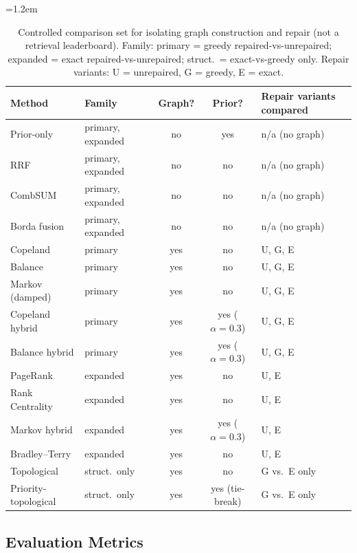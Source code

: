 \documentclass[pdflatex,sn-basic,Numbered]{sn-jnl}
\newcommand{\sncstable}{%
  \footnotesize
  \renewcommand{\arraystretch}{1.28}%
  \setlength{\tabcolsep}{3.8pt}%
  \tolerance=2000%
  \emergencystretch=1.2em%
  \hyphenpenalty=200\exhyphenpenalty=200\relax
}
\begin{document}
\begin{table}[t]
  \caption{Controlled comparison set for isolating graph construction and
    repair (not a retrieval leaderboard). Family: primary = greedy
    repaired-vs-unrepaired; expanded = exact repaired-vs-unrepaired;
    struct.\ = exact-vs-greedy only. Repair variants: U = unrepaired,
    G = greedy, E = exact.}
  \label{tab:baselines}
  \sncstable
  \begin{tabularx}{\linewidth}{@{}lYccY@{}}
    \toprule
    Method & Family & Graph? & Prior? & Repair variants compared \\
    \midrule
    Prior-only & primary, expanded & no & yes & n/a (no graph) \\
    \addlinespace
    RRF & primary, expanded & no & no & n/a (no graph) \\
    \addlinespace
    CombSUM & primary, expanded & no & no & n/a (no graph) \\
    \addlinespace
    Borda fusion & primary, expanded & no & no & n/a (no graph) \\
    \addlinespace
    Copeland & primary & yes & no & U, G, E \\
    \addlinespace
    Balance & primary & yes & no & U, G, E \\
    \addlinespace
    Markov (damped) & primary & yes & no & U, G, E \\
    \addlinespace
    Copeland hybrid & primary & yes & yes ($\alpha{=}0.3$) & U, G, E \\
    \addlinespace
    Balance hybrid & primary & yes & yes ($\alpha{=}0.3$) & U, G, E \\
    \addlinespace
    PageRank & expanded & yes & no & U, E \\
    \addlinespace
    Rank Centrality & expanded & yes & no & U, E \\
    \addlinespace
    Markov hybrid & expanded & yes & yes ($\alpha{=}0.3$) & U, E \\
    \addlinespace
    Bradley--Terry & expanded & yes & no & U, E \\
    \addlinespace
    Topological & struct.\ only & yes & no & G vs.\ E only \\
    \addlinespace
    Priority-topological & struct.\ only & yes & yes (tie-break) & G vs.\ E only \\
    \bottomrule
  \end{tabularx}
\end{table}

\subsection{Evaluation Metrics}
\label{sec:metrics}
\end{document}
